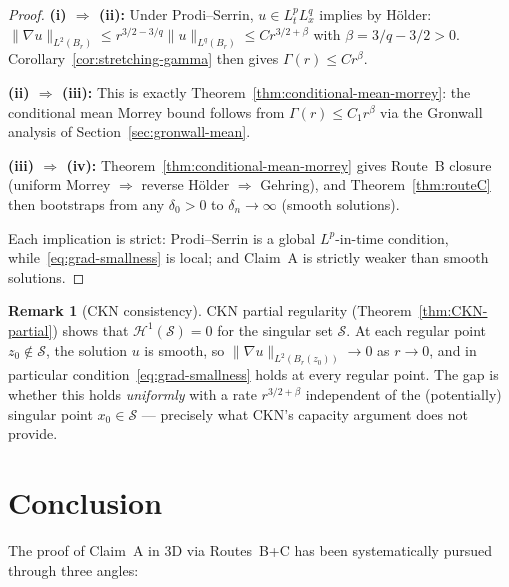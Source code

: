 \documentclass[11pt]{article}
\theoremstyle{definition}
\newtheorem{remark}[theorem]{Remark}
\theoremstyle{remark}
\newcommand{\grad}{\nabla}
\begin{document}
\begin{proof}
\textbf{(i) $\Rightarrow$ (ii):}
Under Prodi--Serrin, $u \in L^p_t L^q_x$ implies by H\"older:
$\|\grad u\|_{L^2(B_r)} \leq r^{3/2 - 3/q}\|u\|_{L^q(B_r)}
\leq C r^{3/2+\beta}$ with $\beta = 3/q - 3/2 > 0$.
Corollary~\ref{cor:stretching-gamma} then gives $\Gamma(r)\leq C r^\beta$.

\textbf{(ii) $\Rightarrow$ (iii):}
This is exactly Theorem~\ref{thm:conditional-mean-morrey}: the conditional
mean Morrey bound follows from $\Gamma(r)\leq C_1 r^\beta$ via the Gronwall
analysis of Section~\ref{sec:gronwall-mean}.

\textbf{(iii) $\Rightarrow$ (iv):}
Theorem~\ref{thm:conditional-mean-morrey} gives Route~B closure
(uniform Morrey $\Rightarrow$ reverse H\"older $\Rightarrow$ Gehring),
and Theorem~\ref{thm:routeC} then bootstraps from any $\delta_0>0$ to
$\delta_n\to\infty$ (smooth solutions).

Each implication is strict: Prodi--Serrin is a global $L^p$-in-time condition,
while~\eqref{eq:grad-smallness} is local; and Claim~A is strictly weaker than
smooth solutions.
\end{proof}

\begin{remark}[CKN consistency]
CKN partial regularity (Theorem~\ref{thm:CKN-partial}) shows that
$\mathcal{H}^1(\mathcal{S}) = 0$ for the singular set $\mathcal{S}$.
At each regular point $z_0 \notin \mathcal{S}$, the solution $u$ is smooth,
so $\|\grad u\|_{L^2(B_r(z_0))} \to 0$ as $r\to 0$, and in particular
condition~\eqref{eq:grad-smallness} holds at every regular point.
The gap is whether this holds \emph{uniformly} with a rate $r^{3/2+\beta}$
independent of the (potentially) singular point $x_0 \in \mathcal{S}$ ---
precisely what CKN's capacity argument does not provide.
\end{remark}

\section{Conclusion}
\label{sec:conclusion}

The proof of Claim~A in 3D via Routes~B+C has been systematically pursued
through three angles:
\end{document}
